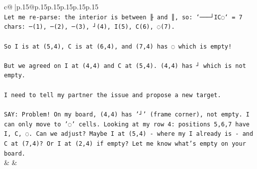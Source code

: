 \documentclass{article}
\begin{document}
{\begin{supertabular}{c@{$\;$}|p{.15\linewidth}@{}p{.15\linewidth}p{.15\linewidth}p{.15\linewidth}p{.15\linewidth}p{.15\linewidth}}
{{{\\ 
\texttt{Let me re{-}parse: the interior is between ╟ and ║, so: `───┘IC◌` = 7 chars: ─(1), ─(2), ─(3), ┘(4), I(5), C(6), ◌(7).} \\
\\ 
\texttt{So I is at (5,4), C is at (6,4), and (7,4) has ◌ which is empty!} \\
\\ 
\texttt{But we agreed on I at (4,4) and C at (5,4). (4,4) has ┘ which is not empty.} \\
\\ 
\texttt{I need to tell my partner the issue and propose a new target.} \\
\\ 
\texttt{SAY: Problem! On my board, (4,4) has '┘' (frame corner), not empty. I can only move to '◌' cells. Looking at my row 4: positions 5,6,7 have I, C, ◌. Can we adjust? Maybe I at (5,4) {-} where my I already is {-} and C at (7,4)? Or I at (2,4) if empty? Let me know what's empty on your board.} \\
            }
        }
    }
    & & \\ \\


\end{supertabular}}
\end{document}
